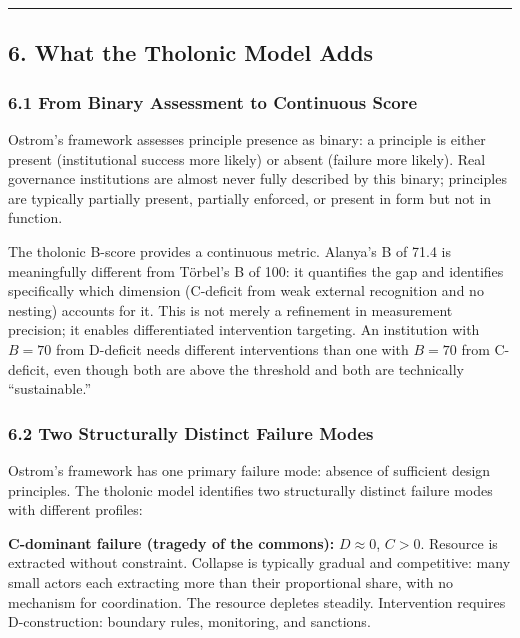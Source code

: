 \documentclass[
  11pt,
  letterpaper,
]{article}
\begin{document}
\begin{center}\rule{0.5\linewidth}{0.5pt}\end{center}

\subsection{6. What the Tholonic Model
Adds}\label{what-the-tholonic-model-adds}

\subsubsection{6.1 From Binary Assessment to Continuous
Score}\label{from-binary-assessment-to-continuous-score}

Ostrom's framework assesses principle presence as binary: a principle is
either present (institutional success more likely) or absent (failure
more likely). Real governance institutions are almost never fully
described by this binary; principles are typically partially present,
partially enforced, or present in form but not in function.

The tholonic B-score provides a continuous metric. Alanya's B of 71.4 is
meaningfully different from Törbel's B of 100: it quantifies the gap and
identifies specifically which dimension (C-deficit from weak external
recognition and no nesting) accounts for it. This is not merely a
refinement in measurement precision; it enables differentiated
intervention targeting. An institution with \(B = 70\) from D-deficit
needs different interventions than one with \(B = 70\) from C-deficit,
even though both are above the threshold and both are technically
``sustainable.''

\subsubsection{6.2 Two Structurally Distinct Failure
Modes}\label{two-structurally-distinct-failure-modes}

Ostrom's framework has one primary failure mode: absence of sufficient
design principles. The tholonic model identifies two structurally
distinct failure modes with different profiles:

\textbf{C-dominant failure (tragedy of the commons):} \(D \approx 0\),
\(C > 0\). Resource is extracted without constraint. Collapse is
typically gradual and competitive: many small actors each extracting
more than their proportional share, with no mechanism for coordination.
The resource depletes steadily. Intervention requires D-construction:
boundary rules, monitoring, and sanctions.
\end{document}
